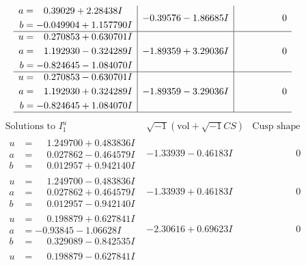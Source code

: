 \documentclass[1p]{elsarticle_modified}
\theoremstyle{definition}
\newcommand{\I}{\sqrt{-1}}
\begin{document}
$$\begin{array}{c|c|c}
\begin{aligned}
a &= \phantom{-}0.39029 + 2.28438 I \\
b &= -0.049904 + 1.157790 I\end{aligned}
 & -0.39576 - 1.86685 I & \phantom{-0.000000 } 0 \\ \hline\begin{aligned}
u &= \phantom{-}0.270853 + 0.630701 I \\
a &= \phantom{-}1.192930 - 0.324289 I \\
b &= -0.824645 - 1.084070 I\end{aligned}
 & -1.89359 + 3.29036 I & \phantom{-0.000000 } 0 \\ \hline\begin{aligned}
u &= \phantom{-}0.270853 - 0.630701 I \\
a &= \phantom{-}1.192930 + 0.324289 I \\
b &= -0.824645 + 1.084070 I\end{aligned}
 & -1.89359 - 3.29036 I & \phantom{-0.000000 } 0\\
 \hline 
 \end{array}$$\newpage$$\begin{array}{c|c|c}  
\text{Solutions to }I^u_{1}& \I (\text{vol} + \sqrt{-1}CS) & \text{Cusp shape}\\
 \hline 
\begin{aligned}
u &= \phantom{-}1.249700 + 0.483836 I \\
a &= \phantom{-}0.027862 - 0.464579 I \\
b &= \phantom{-}0.012957 + 0.942140 I\end{aligned}
 & -1.33939 - 0.46183 I & \phantom{-0.000000 } 0 \\ \hline\begin{aligned}
u &= \phantom{-}1.249700 - 0.483836 I \\
a &= \phantom{-}0.027862 + 0.464579 I \\
b &= \phantom{-}0.012957 - 0.942140 I\end{aligned}
 & -1.33939 + 0.46183 I & \phantom{-0.000000 } 0 \\ \hline\begin{aligned}
u &= \phantom{-}0.198879 + 0.627841 I \\
a &= -0.93845 - 1.06628 I \\
b &= \phantom{-}0.329089 - 0.842535 I\end{aligned}
 & -2.30616 + 0.69623 I & \phantom{-0.000000 } 0 \\ \hline\begin{aligned}
u &= \phantom{-}0.198879 - 0.627841 I \\

\end{aligned}
\end{array}$$
\end{document}
